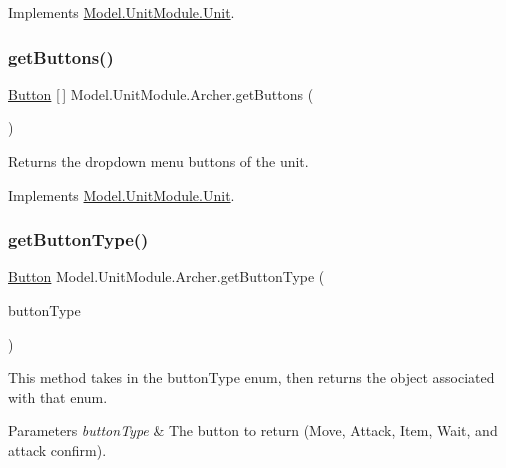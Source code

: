 Implements \hyperlink{interface_model_1_1_unit_module_1_1_unit_ac8e47a3f8d13fe8a719f962a3ee9ee46}{Model.\+Unit\+Module.\+Unit}.

\hypertarget{class_model_1_1_unit_module_1_1_archer_a8306cd02babf69626ce85bed7e76d089}{}\label{class_model_1_1_unit_module_1_1_archer_a8306cd02babf69626ce85bed7e76d089} 
\subsubsection{\texorpdfstring{get\+Buttons()}{getButtons()}}
{\footnotesize\ttfamily \hyperlink{class_model_1_1_button}{Button} \mbox{[}$\,$\mbox{]} Model.\+Unit\+Module.\+Archer.\+get\+Buttons (\begin{DoxyParamCaption}{ }\end{DoxyParamCaption})\hspace{0.3cm}{\ttfamily [inline]}}

Returns the dropdown menu buttons of the unit. 

Implements \hyperlink{interface_model_1_1_unit_module_1_1_unit_a5256d2141e9c59e0454e47ac65246bda}{Model.\+Unit\+Module.\+Unit}.

\hypertarget{class_model_1_1_unit_module_1_1_archer_af4d544ecd34e57d071a129fb7d0f155d}{}\label{class_model_1_1_unit_module_1_1_archer_af4d544ecd34e57d071a129fb7d0f155d} 
\subsubsection{\texorpdfstring{get\+Button\+Type()}{getButtonType()}}
{\footnotesize\ttfamily \hyperlink{class_model_1_1_button}{Button} Model.\+Unit\+Module.\+Archer.\+get\+Button\+Type (\begin{DoxyParamCaption}\item[{\hyperlink{namespace_model_ac76b3489c9d704f49912608bd36cd0e7}{Button\+Type}}]{button\+Type }\end{DoxyParamCaption})\hspace{0.3cm}{\ttfamily [inline]}}

This method takes in the button\+Type enum, then returns the object associated with that enum. 
\begin{DoxyParams}{Parameters}
{\em button\+Type} & The button to return (Move, Attack, Item, Wait, and attack confirm). \\
\hline
\end{DoxyParams}


